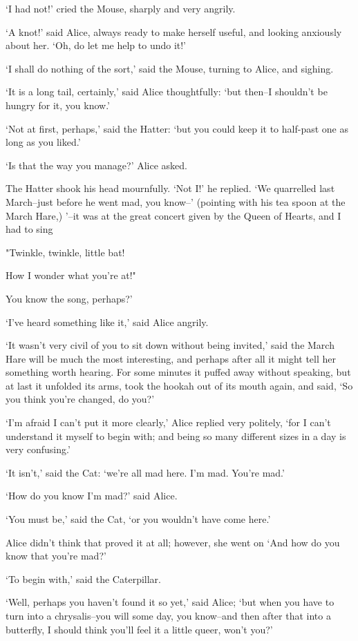 \documentclass[statementpaper,twoside,openany]{memoir}
\begin{document}
`I had not!' cried the Mouse, sharply and very angrily.

`A knot!' said Alice, always ready to make herself useful, and looking anxiously about her. `Oh, do let me help to undo it!'

`I shall do nothing of the sort,' said the Mouse, turning to Alice, and sighing.

`It is a long tail, certainly,' said Alice thoughtfully: `but then--I shouldn't be hungry for it, you know.'

`Not at first, perhaps,' said the Hatter: `but you could keep it to half-past one as long as you liked.'

`Is that the way you manage?' Alice asked.

The Hatter shook his head mournfully. `Not I!' he replied. `We quarrelled last March--just before he went mad, you know--' (pointing with his tea spoon at the March Hare,) '--it was at the great concert given by the Queen of Hearts, and I had to sing

"Twinkle, twinkle, little bat!

How I wonder what you're at!"

You know the song, perhaps?'

`I've heard something like it,' said Alice angrily.

`It wasn't very civil of you to sit down without being invited,' said the March Hare will be much the most interesting, and perhaps after all it might tell her something worth hearing. For some minutes it puffed away without speaking, but at last it unfolded its arms, took the hookah out of its mouth again, and said, `So you think you're changed, do you?'

`I'm afraid I can't put it more clearly,' Alice replied very politely, `for I can't understand it myself to begin with; and being so many different sizes in a day is very confusing.'

`It isn't,' said the Cat: `we're all mad here. I'm mad. You're mad.'

`How do you know I'm mad?' said Alice.

`You must be,' said the Cat, `or you wouldn't have come here.'

Alice didn't think that proved it at all; however, she went on `And how do you know that you're mad?'

`To begin with,' said the Caterpillar.

`Well, perhaps you haven't found it so yet,' said Alice; `but when you have to turn into a chrysalis--you will some day, you know--and then after that into a butterfly, I should think you'll feel it a little queer, won't you?'
\end{document}
